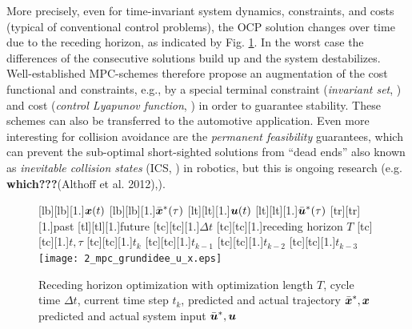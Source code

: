  More precisely, even for time-invariant system dynamics, constraints, and costs (typical of conventional control problems), the OCP solution changes over time due to the receding horizon, as indicated by Fig. \ref{fig:2_mpc_grundidee_u_x}. In the worst case the differences of the consecutive solutions build up and the system destabilizes. Well-established MPC-schemes therefore propose an augmentation of the cost functional and constraints, e.g., by a special terminal constraint (\emph{invariant set},  \cite{blanchini1999survey})%
  and cost (\emph{control Lyapunov function}, \cite{gruene2011nonlinear})%
   in order to guarantee stability. These schemes can also be transferred to the automotive application. Even more interesting for collision avoidance are the \emph{permanent feasibility} guarantees, which can prevent the sub-optimal short-sighted solutions from “dead ends” also known as \emph{inevitable collision states} (ICS, \cite{fraichard2007short})%
    in robotics, but this is ongoing research (e.g. \textbf{which???}(Althoff et al. 2012),\cite{Lawitzky2014ICRA}).%




\begin{figure}[h]
\centering
    [lb][lb][1.]{$\boldsymbol{x}(t)$}
		[lb][lb][1.]{$\bar{\boldsymbol{x}}^\ast(\tau)$}
		[lt][lt][1.]{$\boldsymbol{u}(t)$}
		[lt][lt][1.]{$\bar{\boldsymbol{u}}^\ast(\tau)$}
		[tr][tr][1.]{past}
		[tl][tl][1.]{future}
		[tc][tc][1.]{$\Delta t$}
		[tc][tc][1.]{receding horizon $T$}
		[tc][tc][1.]{$t,\tau$}
		[tc][tc][1.]{$t_k$}
		[tc][tc][1.]{$t_{k-1}$}
		[tc][tc][1.]{$t_{k-2}$}
		[tc][tc][1.]{$t_{k-3}$}
	\texttt{[image: 2\_mpc\_grundidee\_u\_x.eps]}
	\caption[Receding Horizon Optimization]{Receding horizon optimization with optimization length $T$, cycle time $\Delta t$, current time step $t_k$, predicted and actual trajectory  $\bar{\boldsymbol{x}}^\ast, \boldsymbol{x}$ predicted and actual system input $\bar{\boldsymbol{u}}^\ast, \boldsymbol{u}$}
	\label{fig:2_mpc_grundidee_u_x}
\end{figure}










